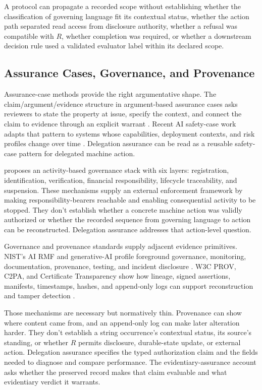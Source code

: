 A protocol can propagate a recorded scope without establishing whether the classification of governing language fit its contextual status, whether the action path separated read access from disclosure authority, whether a refusal was compatible with \(R\), whether completion was required, or whether a downstream decision rule used a validated evaluator label within its declared scope.

\subsection{Assurance Cases, Governance, and Provenance}

Assurance-case methods provide the right argumentative shape. The claim/argument/evidence structure in argument-based assurance cases asks reviewers to state the property at issue, specify the context, and connect the claim to evidence through an explicit warrant \parencite{icoAssuranceCases2026}. Recent AI safety-case work adapts that pattern to systems whose capabilities, deployment contexts, and risk profiles change over time \parencite{lee2026structuredSafetyCases}. Delegation assurance can be read as a reusable safety-case pattern for delegated machine action.

\textcite{rajagopalan2026governingAgenticAI} proposes an activity-based governance stack with six layers: registration, identification, verification, financial responsibility, lifecycle traceability, and suspension. These mechanisms supply an external enforcement framework by making responsibility-bearers reachable and enabling consequential activity to be stopped. They don't establish whether a concrete machine action was validly authorized or whether the recorded sequence from governing language to action can be reconstructed. Delegation assurance addresses that action-level question.

Governance and provenance standards supply adjacent evidence primitives. NIST's AI RMF and generative-AI profile foreground governance, monitoring, documentation, provenance, testing, and incident disclosure \parencite{nist2023artificial,nist2024generative}. W3C PROV, C2PA, and Certificate Transparency show how lineage, signed assertions, manifests, timestamps, hashes, and append-only logs can support reconstruction and tamper detection \parencite{moreau2013provdm,c2pa2026spec,laurie2021certificateTransparencyV2}.

Those mechanisms are necessary but normatively thin. Provenance can show where content came from, and an append-only log can make later alteration harder. They don't establish a string occurrence's contextual status, its source's standing, or whether \(R\) permits disclosure, durable-state update, or external action. Delegation assurance specifies the typed authorization claim and the fields needed to diagnose and compare performance. The evidentiary-assurance account \parencite{reynolds2026evidentiaryAssurance} asks whether the preserved record makes that claim evaluable and what evidentiary verdict it warrants.

